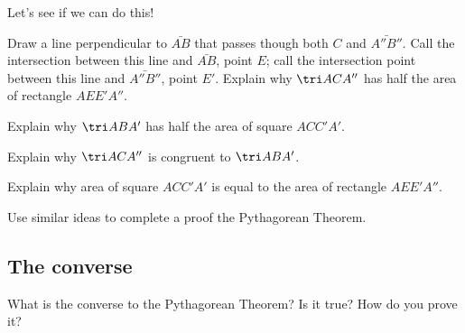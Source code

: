 \documentclass{ximera}
\begin{document}
Let's see if we can do this!


\begin{question}
Draw a line perpendicular to $\bar{AB}$ that passes though both $C$
and $\bar{A'' B''}$. Call the intersection between this line and
$\bar{AB}$, point $E$; call the intersection point between this line
and $\bar{A''B''}$, point $E'$. Explain why $\tri ACA''$ has half the
area of rectangle $AEE'A''$.
\end{question}

\begin{question}
Explain why $\tri ABA'$ has half the area of square $ACC'A'$.
\end{question}

\begin{question}
Explain why $\tri ACA''$ is congruent to $\tri ABA'$. 
\end{question}

\begin{question}
Explain why area of square $ACC'A'$ is equal to the area of rectangle
$AEE'A''$.
\end{question}


\begin{question}
Use similar ideas to complete a proof the Pythagorean Theorem.
\end{question}


\subsection*{The converse}

\begin{question} What is the converse to the Pythagorean Theorem? Is it true? How do you prove it?
\end{question}
\end{document}
